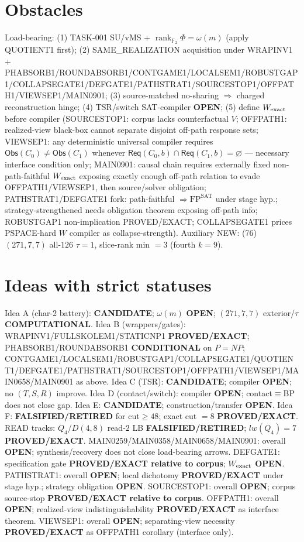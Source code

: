 \documentclass[11pt]{article}
\begin{document}
\section*{Obstacles}
Load-bearing: (1) TASK-001 SU/vMS + $\operatorname{rank}_{\mathbb F_2}\Phi=\omega(m)$ (apply QUOTIENT1 first);
(2) SAME\_REALIZATION acquisition under WRAPINV1 + PHABSORB1/ROUNDABSORB1/CONTGAME1/LOCALSEM1/ROBUSTGAP1/COLLAPSEGATE1/DEFGATE1/PATHSTRAT1/SOURCESTOP1/OFFPATH1/VIEWSEP1/MAIN0901;
(3) source-matched no-sharing $\Rightarrow$ charged reconstruction hinge;
(4) TSR/switch SAT-compiler \textbf{OPEN};
(5) define $W_{\rm exact}$ before compiler (SOURCESTOP1: corpus lacks counterfactual $V$;
OFFPATH1: realized-view black-box cannot separate disjoint off-path response sets;
VIEWSEP1: any deterministic universal compiler requires $\mathsf{Obs}(C_0)\ne\mathsf{Obs}(C_1)$
whenever $\mathsf{Req}(C_0,b)\cap\mathsf{Req}(C_1,b)=\varnothing$ --- necessary interface condition only;
MAIN0901: causal chain requires externally fixed non-path-faithful $W_{\rm exact}$ exposing
exactly enough off-path relation to evade OFFPATH1/VIEWSEP1, then source/solver obligation;
PATHSTRAT1/DEFGATE1 fork: path-faithful $\Rightarrow\mathrm{FP}^{\mathrm{SAT}}$ under stage hyp.;
strategy-strengthened needs obligation theorem exposing off-path info;
ROBUSTGAP1 non-implication PROVED/EXACT; COLLAPSEGATE1 prices PSPACE-hard $W$ compiler as collapse-strength).
Auxiliary NEW: (76) $(271,7,7)$ all-$126$ $\tau{=}1$, slice-rank min $=3$ (fourth $k{=}9$).

\section*{Ideas with strict statuses}
Idea A (char-2 battery): \textbf{CANDIDATE}; $\omega(m)$ \textbf{OPEN}; $(271,7,7)$ exterior/$\tau$ \textbf{COMPUTATIONAL}.
Idea B (wrappers/gates): WRAPINV1/FULLSKOLEM1/STATICNP1 \textbf{PROVED/EXACT};
PHABSORB1/ROUNDABSORB1 \textbf{CONDITIONAL} on $P=NP$;
CONTGAME1/LOCALSEM1/ROBUSTGAP1/COLLAPSEGATE1/QUOTIENT1/DEFGATE1/PATHSTRAT1/SOURCESTOP1/OFFPATH1/VIEWSEP1/MAIN0658/MAIN0901 as above.
Idea C (TSR): \textbf{CANDIDATE}; compiler \textbf{OPEN}; no $(T,S,R)$ improve.
Idea D (contact/switch): compiler \textbf{OPEN}; contact$\equiv$BP does not close gap.
Idea E: \textbf{CANDIDATE}; construction/transfer \textbf{OPEN}.
Idea F: \textbf{FALSIFIED/RETIRED} for cut$\ge48$; exact cut $=8$ \textbf{PROVED/EXACT}.
READ tracks: $Q_4$/$D(4,8)$ read-$2$ LB \textbf{FALSIFIED/RETIRED}; $lw(Q_4)=7$ \textbf{PROVED/EXACT}.
MAIN0259/MAIN0358/MAIN0658/MAIN0901: overall \textbf{OPEN}; synthesis/recovery does not close load-bearing arrows.
DEFGATE1: specification gate \textbf{PROVED/EXACT relative to corpus}; $W_{\rm exact}$ \textbf{OPEN}.
PATHSTRAT1: overall \textbf{OPEN}; local dichotomy \textbf{PROVED/EXACT} under stage hyp.; strategy obligation \textbf{OPEN}.
SOURCESTOP1: overall \textbf{OPEN}; corpus source-stop \textbf{PROVED/EXACT relative to corpus}.
OFFPATH1: overall \textbf{OPEN}; realized-view indistinguishability \textbf{PROVED/EXACT} as interface theorem.
VIEWSEP1: overall \textbf{OPEN}; separating-view necessity \textbf{PROVED/EXACT} as OFFPATH1 corollary (interface only).
\end{document}
